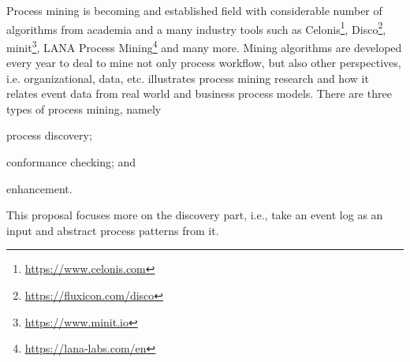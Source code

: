 \documentclass[a4paper,11pt]{article}
\begin{document}
Process mining is becoming and established field with considerable number of algorithms from academia and a many industry tools such as Celonis\footnote{\url{https://www.celonis.com}}, Disco\footnote{\url{https://fluxicon.com/disco}}, minit\footnote{\url{https://www.minit.io}}, LANA Process Mining\footnote{\url{https://lana-labs.com/en}} and many more. 
Mining algorithms are developed every year to deal to mine not only process workflow, but also other perspectives, i.e. organizational, data, etc.  illustrates process mining research and how it relates event data from real world and business process models.
There are three types of process mining, namely \begin{inparaenum}[\itshape i)]
	\item process discovery;
	\item conformance checking; and
	\item enhancement.
\end{inparaenum} This proposal focuses more on the discovery part, i.e., take an event log as an input and abstract process patterns from it. 


%	
%	
%	
%	
\end{document}
